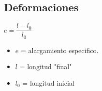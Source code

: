 \documentclass[11pt,a4paper]{article}
\begin{document}
\begin{multicols}{2}
\begin{cajita}
	\end{cajita}

	\begin{cajita}
		\section*{Deformaciones}
		\begin{center}
			$e=\dfrac{l-l_{0}}{l_{0}}$
		\end{center}
		\begin{itemize}[itemsep=-2mm]
			\item $e$ = alargamiento especifico.
			\item $l$ = longitud "final"
			\item $l_{0}$ = longitud inicial
		\end{itemize}
	\end{cajita}
\end{multicols}
\end{document}
